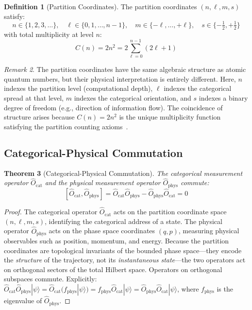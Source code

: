 \documentclass[12pt]{article}
\newtheorem{theorem}{Theorem}[section]
\theoremstyle{definition}
\newtheorem{definition}[theorem]{Definition}
\theoremstyle{remark}
\newtheorem{remark}[theorem]{Remark}
\newcommand{\Ocat}{\hat{O}_{\mathrm{cat}}}
\newcommand{\Ophys}{\hat{O}_{\mathrm{phys}}}
\begin{document}
\begin{definition}[Partition Coordinates]
\label{def:partition}
The partition coordinates $(n, \ell, m, s)$ satisfy:
\begin{equation}
\label{eq:partition_coords}
n \in \{1, 2, 3, \ldots\}, \quad \ell \in \{0, 1, \ldots, n-1\}, \quad m \in \{-\ell, \ldots, +\ell\}, \quad s \in \{-\tfrac{1}{2}, +\tfrac{1}{2}\}
\end{equation}
with total multiplicity at level $n$:
\begin{equation}
\label{eq:multiplicity}
C(n) = 2n^2 = 2\sum_{\ell=0}^{n-1}(2\ell + 1)
\end{equation}
\end{definition}

\begin{remark}
The partition coordinates have the same algebraic structure as atomic quantum numbers, but their physical interpretation is entirely different. Here, $n$ indexes the partition level (computational depth), $\ell$ indexes the categorical spread at that level, $m$ indexes the categorical orientation, and $s$ indexes a binary degree of freedom (e.g., direction of information flow). The coincidence of structure arises because $C(n) = 2n^2$ is the unique multiplicity function satisfying the partition counting axioms~\citep{sachikonye2026partition, sachikonye2026counting}.
\end{remark}

\subsection{Categorical-Physical Commutation}

\begin{theorem}[Categorical-Physical Commutation]
\label{thm:commutation}
The categorical measurement operator $\Ocat$ and the physical measurement operator $\Ophys$ commute:
\begin{equation}
\label{eq:commutation}
[\Ocat, \Ophys] = \Ocat \Ophys - \Ophys \Ocat = 0
\end{equation}
\end{theorem}

\begin{proof}
The categorical operator $\Ocat$ acts on the partition coordinate space $(n, \ell, m, s)$, identifying the categorical address of a state. The physical operator $\Ophys$ acts on the phase space coordinates $(q, p)$, measuring physical observables such as position, momentum, and energy. Because the partition coordinates are topological invariants of the bounded phase space---they encode the \emph{structure} of the trajectory, not its \emph{instantaneous state}---the two operators act on orthogonal sectors of the total Hilbert space. Operators on orthogonal subspaces commute. Explicitly: $\Ocat \Ophys |\psi\rangle = \Ocat (f_{\mathrm{phys}} |\psi\rangle) = f_{\mathrm{phys}} \Ocat |\psi\rangle = \Ophys \Ocat |\psi\rangle$, where $f_{\mathrm{phys}}$ is the eigenvalue of $\Ophys$. \qedhere
\end{proof}
\end{document}
